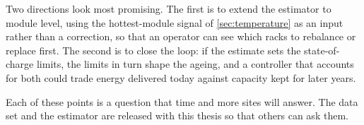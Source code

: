 Two directions look most promising. The first is to extend the
estimator to module level, using the hottest-module signal of
\cref{sec:temperature} as an input rather than a correction, so that an
operator can see which racks to rebalance or replace first. The second is
to close the loop: if the estimate sets the state-of-charge limits, the
limits in turn shape the ageing, and a controller that accounts for both
could trade energy delivered today against capacity kept for later years.

Each of these points is a question that time and more sites will answer.
The data set and the estimator are released with this thesis so that
others can ask them.
